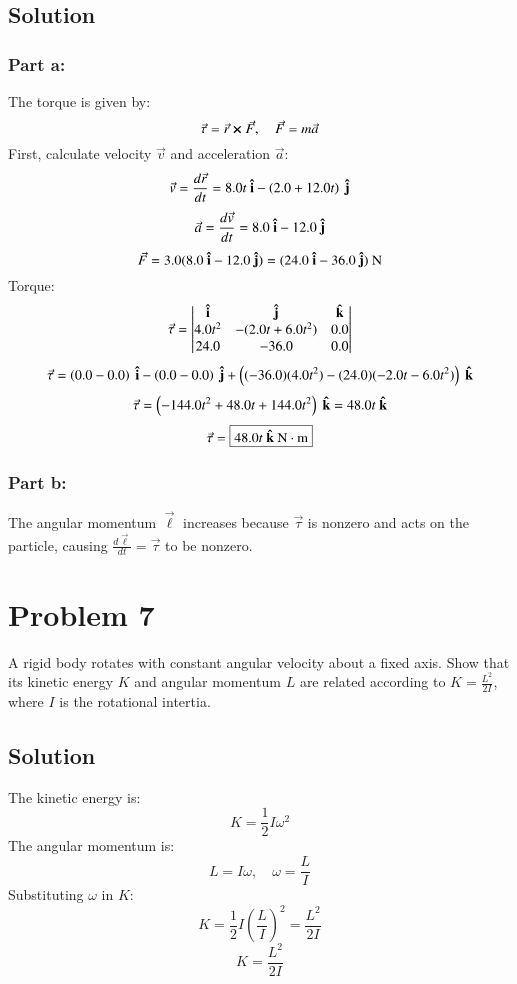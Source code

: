 \documentclass{article}
\begin{document}
\subsection*{Solution}
\subsubsection*{Part a:}
The torque is given by:
\[
\vec \tau = \vec r \cross \vec F,\quad \vec F = m \vec a
\]
First, calculate velocity $\vec v$ and acceleration $\vec a$:
\[
\vec v = \frac{d\vec r}{dt} = 8.0t\ \vu i - \left( 2.0 + 12.0t \right)\ \vu j
\]
\[
\vec a = \frac{d\vec v}{dt} = 8.0\ \vu i - 12.0\ \vu j
\]
\[
\vec F = 3.0 (8.0\ \vu i - 12.0\ \vu j) = (24.0\ \vu i - 36.0\ \vu j)\ \text{N}
\]
Torque:
\[
\vec \tau = \begin{vmatrix}
\vu i & \vu j & \vu k \\
4.0t^2 & -(2.0t + 6.0t^2) & 0.0 \\
24.0 & -36.0 & 0.0
\end{vmatrix}
\]
\[
\vec \tau = \left(0.0 - 0.0\right)\ \vu i - \left(0.0 - 0.0\right)\ \vu j + \left((-36.0)(4.0t^2) - (24.0)(-2.0t - 6.0t^2)\right)\ \vu k
\]
\[
\vec \tau = \left(-144.0t^2 + 48.0t + 144.0t^2\right)\ \vu k = 48.0t\ \vu k
\]
\[
\vec \tau = \boxed{48.0t\ \vu k\ \text{N}\cdot\text{m}}
\]

\subsubsection*{Part b:}
The angular momentum $\vec \ell$ increases because $\vec \tau$ is nonzero and acts on the particle, causing $\frac{d\vec \ell}{dt} = \vec \tau$ to be nonzero.

\section*{Problem 7}
A rigid body rotates with constant angular velocity about a fixed axis. Show that its kinetic energy $K$ and angular momentum $L$ are related according to $K = \frac{L^2}{2I}$, where $I$ is the rotational intertia.

\subsection*{Solution}
The kinetic energy is:
\[
K = \frac{1}{2} I \omega^2
\]
The angular momentum is:
\[
L = I \omega,\quad \omega = \frac{L}{I}
\]
Substituting $\omega$ in $K$:
\[
K = \frac{1}{2} I \left(\frac{L}{I}\right)^2 = \frac{L^2}{2I}
\]
\[
\boxed{K = \frac{L^2}{2I}}
\]
\end{document}
